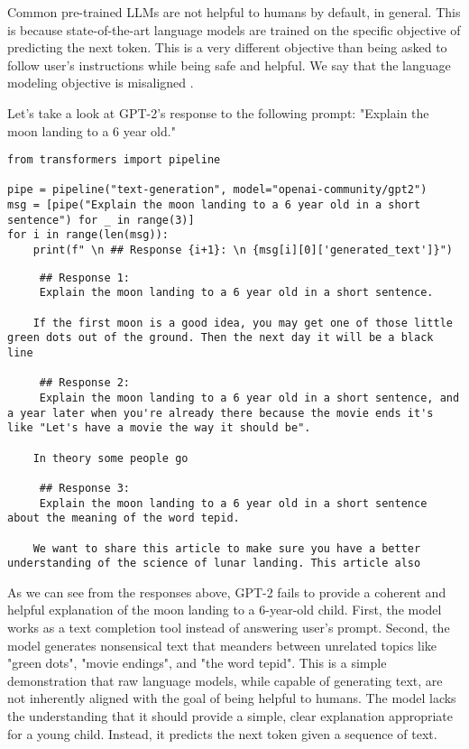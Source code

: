 Common pre-trained LLMs are not helpful to humans by default, in general. This is because state-of-the-art language models are trained on the specific objective of predicting the next token. This is a very different objective than being asked to follow user's instructions while being safe and helpful. We say that the language modeling objective is misaligned .

Let's take a look at GPT-2's response to the following prompt: "Explain the moon landing to a 6 year old."

\begin{verbatim}
from transformers import pipeline

pipe = pipeline("text-generation", model="openai-community/gpt2")
msg = [pipe("Explain the moon landing to a 6 year old in a short sentence") for _ in range(3)]
for i in range(len(msg)):
    print(f" \n ## Response {i+1}: \n {msg[i][0]['generated_text']}")
\end{verbatim}

\begin{verbatim}
     ## Response 1: 
     Explain the moon landing to a 6 year old in a short sentence.
    
    If the first moon is a good idea, you may get one of those little green dots out of the ground. Then the next day it will be a black line
     
     ## Response 2: 
     Explain the moon landing to a 6 year old in a short sentence, and a year later when you're already there because the movie ends it's like "Let's have a movie the way it should be".
    
    In theory some people go
     
     ## Response 3: 
     Explain the moon landing to a 6 year old in a short sentence about the meaning of the word tepid.
    
    We want to share this article to make sure you have a better understanding of the science of lunar landing. This article also
\end{verbatim}
As we can see from the responses above, GPT-2 fails to provide a coherent and helpful explanation of the moon landing to a 6-year-old child. First, the model works as a text completion tool instead of answering user's prompt. Second, the model generates nonsensical text that meanders between unrelated topics like "green dots", "movie endings", and "the word tepid". This is a simple demonstration that raw language models, while capable of generating text, are not inherently aligned with the goal of being helpful to humans. The model lacks the understanding that it should provide a simple, clear explanation appropriate for a young child. Instead, it predicts the next token given a sequence of text.

